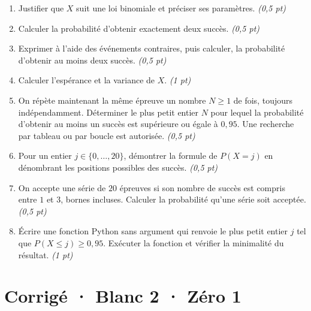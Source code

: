\begin{enumerate}

\item Justifier que $X$ suit une loi binomiale et préciser ses paramètres. \hfill\textit{(0{,}5 pt)}

\item Calculer la probabilité d'obtenir exactement deux succès. \hfill\textit{(0{,}5 pt)}

\item Exprimer à l'aide des événements contraires, puis calculer, la probabilité d'obtenir au moins deux succès. \hfill\textit{(0{,}5 pt)}

\item Calculer l'espérance et la variance de $X$. \hfill\textit{(1 pt)}

\item On répète maintenant la même épreuve un nombre $N\ge1$ de fois, toujours indépendamment. Déterminer le plus petit entier $N$ pour lequel la probabilité d'obtenir au moins un succès est supérieure ou égale à $0{,}95$. Une recherche par tableau ou par boucle est autorisée. \hfill\textit{(0{,}5 pt)}

\item Pour un entier $j\in\{0,\ldots,20\}$, démontrer la formule de $P(X=j)$ en dénombrant les positions possibles des succès. \hfill\textit{(0{,}5 pt)}

\item On accepte une série de $20$ épreuves si son nombre de succès est compris entre $1$ et $3$, bornes incluses. Calculer la probabilité qu'une série soit acceptée. \hfill\textit{(0{,}5 pt)}

\item Écrire une fonction Python sans argument qui renvoie le plus petit entier $j$ tel que $P(X\le j)\ge0{,}95$. Exécuter la fonction et vérifier la minimalité du résultat. \hfill\textit{(1 pt)}

\end{enumerate}

\ifmxteacher\mxnewpage

\section*{Corrigé · Blanc 2 · Zéro 1}\label{cor:8-1}


